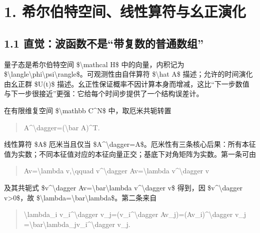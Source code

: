 \documentclass[UTF8,openany,11pt,fontset=fandol]{ctexbook}
\begin{document}
\section{\texorpdfstring{\textbf{1.
希尔伯特空间、线性算符与幺正演化}}{1. 希尔伯特空间、线性算符与幺正演化}}\label{ux5e0cux5c14ux4f2fux7279ux7a7aux95f4ux7ebfux6027ux7b97ux7b26ux4e0eux5e7aux6b63ux6f14ux5316}

\subsection{\texorpdfstring{\textbf{1.1
直觉：波函数不是``带复数的普通数组''}}{1.1 直觉：波函数不是``带复数的普通数组''}}\label{ux76f4ux89c9ux6ce2ux51fdux6570ux4e0dux662fux5e26ux590dux6570ux7684ux666eux901aux6570ux7ec4}

量子态是希尔伯特空间 \$\textbackslash mathcal H\$ 中的向量，内积记为
\$\textbackslash langle\textbackslash phi\textbar\textbackslash psi\textbackslash rangle\$。可观测性由自伴算符
\$\textbackslash hat A\$ 描述；允许的时间演化由幺正群 \$U(t)\$
描述。幺正性保证概率不因计算本身而增减，这比``下一步数值与下一步很接近''更强：它给每个时间步提供了一个结构误差计。

在有限维复空间 \$\textbackslash mathbb C\^{}N\$ 中，取厄米共轭转置

\begin{quote}
A\^{}\textbackslash dagger=(\textbackslash bar A)\^{}T.
\end{quote}

线性算符 \$A\$ 厄米当且仅当
\$A\^{}\textbackslash dagger=A\$。厄米性有三条核心后果：所有本征值为实数；不同本征值对应的本征向量正交；基底下对角矩阵为实数。第一条可由

\begin{quote}
Av=\textbackslash lambda v,\textbackslash qquad
v\^{}\textbackslash dagger Av=\textbackslash lambda
v\^{}\textbackslash dagger v
\end{quote}

及其共轭式 \$v\^{}\textbackslash dagger
Av=\textbackslash bar\textbackslash lambda v\^{}\textbackslash dagger
v\$ 得到，因 \$v\^{}\textbackslash dagger v\textgreater0\$，故
\$\textbackslash lambda=\textbackslash bar\textbackslash lambda\$。第二条来自

\begin{quote}
\textbackslash lambda\_i v\_i\^{}\textbackslash dagger
v\_j=(v\_i\^{}\textbackslash dagger
Av\_j)=(Av\_i)\^{}\textbackslash dagger v\_j
=\textbackslash bar\textbackslash lambda\_jv\_i\^{}\textbackslash dagger
v\_j.
\end{quote}
\end{document}
